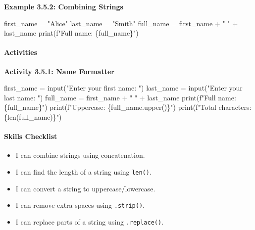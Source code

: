 \documentclass[
  justified,
  openright,
]{tufte-book}
\let\subsection\paragraph
\let\paragraph\paragraph
\newcommand{\StringTok}[1]{\textcolor{CodeString}{#1}}              %
\newcommand{\OperatorTok}[1]{\textcolor{DarkGray}{#1}}              %
\newenvironment{Shaded}{%
  \begin{mdframed}[style=TufteCode]%
}{%
  \end{mdframed}%
}
\let\subsection\paragraph
\let\paragraph\paragraph
\providecommand{\tightlist}{%
  \setlength{\itemsep}{0pt}\setlength{\parskip}{0pt}}
\begin{document}
\textbf{Example 3.5.2: Combining Strings}

\begin{Shaded}
\begin{Highlighting}[]
first\_name \OperatorTok{=} \StringTok{"Alice"}
last\_name \OperatorTok{=} \StringTok{"Smith"}
full\_name \OperatorTok{=} first\_name \OperatorTok{+} \StringTok{" "} \OperatorTok{+} last\_name
print(\StringTok{f"Full name: }\StringTok{\{}full\_name\StringTok{\}}\StringTok{"})
\end{Highlighting}
\end{Shaded}

\subsection{Activities}\label{activities-11}

\textbf{Activity 3.5.1: Name Formatter}

\begin{Shaded}
\begin{Highlighting}[]
first\_name \OperatorTok{=} input(\StringTok{"Enter your first name: "})
last\_name \OperatorTok{=} input(\StringTok{"Enter your last name: "})
full\_name \OperatorTok{=} first\_name \OperatorTok{+} \StringTok{" "} \OperatorTok{+} last\_name
print(\StringTok{f"Full name: }\StringTok{\{}full\_name\StringTok{\}}\StringTok{"})
print(\StringTok{f"Uppercase: }\StringTok{\{}full\_name\StringTok{.}upper()\StringTok{\}}\StringTok{"})
print(\StringTok{f"Total characters: }\StringTok{\{}len(full\_name)\StringTok{\}}\StringTok{"})
\end{Highlighting}
\end{Shaded}

\subsection{Skills Checklist}\label{skills-checklist-16}

\begin{itemize}
\tightlist
\item[$\square$]
  I can combine strings using concatenation.
\item[$\square$]
  I can find the length of a string using \texttt{len()}.
\item[$\square$]
  I can convert a string to uppercase/lowercase.
\item[$\square$]
  I can remove extra spaces using \texttt{.strip()}.
\item[$\square$]
  I can replace parts of a string using \texttt{.replace()}.
\end{itemize}
\end{document}
